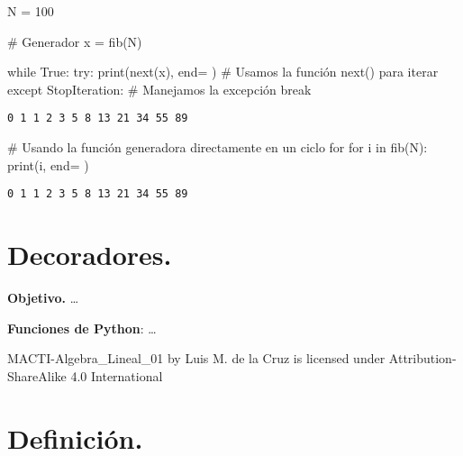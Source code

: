 \documentclass[
  letterpaper,
  DIV=11,
  numbers=noendperiod]{scrreprt}
\newenvironment{Shaded}{\begin{snugshade}}{\end{snugshade}}
\newcommand{\BuiltInTok}[1]{\textcolor[rgb]{0.00,0.23,0.31}{#1}}
\newcommand{\CommentTok}[1]{\textcolor[rgb]{0.37,0.37,0.37}{#1}}
\newcommand{\ControlFlowTok}[1]{\textcolor[rgb]{0.00,0.23,0.31}{#1}}
\newcommand{\DecValTok}[1]{\textcolor[rgb]{0.68,0.00,0.00}{#1}}
\newcommand{\KeywordTok}[1]{\textcolor[rgb]{0.00,0.23,0.31}{#1}}
\newcommand{\NormalTok}[1]{\textcolor[rgb]{0.00,0.23,0.31}{#1}}
\newcommand{\OperatorTok}[1]{\textcolor[rgb]{0.37,0.37,0.37}{#1}}
\newcommand{\PreprocessorTok}[1]{\textcolor[rgb]{0.68,0.00,0.00}{#1}}
\newcommand{\StringTok}[1]{\textcolor[rgb]{0.13,0.47,0.30}{#1}}
\newcommand{\VariableTok}[1]{\textcolor[rgb]{0.07,0.07,0.07}{#1}}
\begin{document}
\begin{Shaded}
\begin{Highlighting}[]
\NormalTok{N }\OperatorTok{=} \DecValTok{100}

\CommentTok{\# Generador}
\NormalTok{x }\OperatorTok{=}\NormalTok{ fib(N)}

\ControlFlowTok{while} \VariableTok{True}\NormalTok{:}
    \ControlFlowTok{try}\NormalTok{:}
        \BuiltInTok{print}\NormalTok{(}\BuiltInTok{next}\NormalTok{(x), end}\OperatorTok{=}\StringTok{\textquotesingle{} \textquotesingle{}}\NormalTok{) }\CommentTok{\# Usamos la función next() para iterar}
    \ControlFlowTok{except} \PreprocessorTok{StopIteration}\NormalTok{:       }\CommentTok{\# Manejamos la excepción}
        \ControlFlowTok{break}
\end{Highlighting}
\end{Shaded}

\begin{verbatim}
0 1 1 2 3 5 8 13 21 34 55 89 
\end{verbatim}

\begin{Shaded}
\begin{Highlighting}[]
\CommentTok{\# Usando la función generadora directamente en un ciclo for}
\ControlFlowTok{for}\NormalTok{ i }\KeywordTok{in}\NormalTok{ fib(N): }
    \BuiltInTok{print}\NormalTok{(i, end}\OperatorTok{=}\StringTok{\textquotesingle{} \textquotesingle{}}\NormalTok{)}
\end{Highlighting}
\end{Shaded}

\begin{verbatim}
0 1 1 2 3 5 8 13 21 34 55 89 
\end{verbatim}


\chapter{Decoradores.}\label{decoradores.}

\textbf{Objetivo.} \ldots{}

\textbf{Funciones de Python}: \ldots{}

MACTI-Algebra\_Lineal\_01 by Luis M. de la Cruz is licensed under
Attribution-ShareAlike 4.0 International


\chapter{Definición.}\label{definiciuxf3n.}
\end{document}
